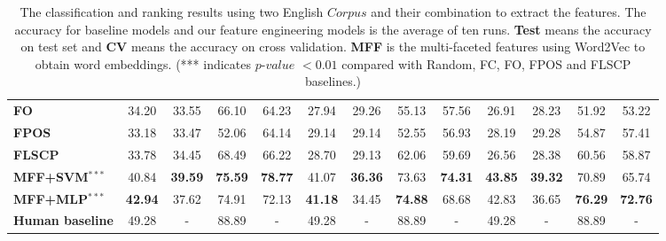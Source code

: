 \begin{table*}[h]
\begin{center}
\begin{tabular}{lcccccccccccc}
			\textbf{FO}&34.20 &33.55 &66.10 &64.23&27.94&29.26&55.13 &57.56 &26.91 &28.23 &51.92 &53.22 \\
			\textbf{FPOS}&33.18&33.47&52.06&64.14&29.14&29.14&52.55&56.93&28.19&29.28&54.87&57.41 \\
			\textbf{FLSCP}&33.78&34.45&68.49&66.22&28.70&29.13&62.06&59.69&26.56&28.38&60.56&58.87\\
			\midrule
			\textbf{MFF+SVM$^{***}$}& 40.84& \textbf{39.59} & \textbf{75.59} & \textbf{78.77}& 41.07& \textbf{36.36} & 73.63 & \textbf{74.31} & \textbf{43.85} & \textbf{39.32}& 70.89& 65.74\\ 
			\textbf{MFF+MLP$^{***}$}&\textbf{42.94}&37.62&74.91&72.13&\textbf{41.18}&34.45&\textbf{74.88}&68.68&42.83&36.65&\textbf{76.29}&\textbf{72.76}\\
			\midrule
			\textbf{Human baseline}&49.28 &-&88.89 &-&49.28 &-&88.89 &-&49.28 &-&88.89 &-\\
			\bottomrule[1pt]
		\end{tabular}
	\end{center}
	\caption{\label{tab:resultsEnglish} 
		The classification and ranking results 
		using two English $Corpus$ and their combination to extract the features.
		The accuracy for baseline models and our feature engineering models is the average of ten runs.
		\textbf{Test} means the accuracy on test set and \textbf{CV} means the accuracy on cross validation.
		\textbf{MFF} is the multi-faceted features using Word2Vec to obtain word embeddings.
		(*** indicates $p$-$value$ $<0.01$ compared with Random, FC, FO, FPOS and FLSCP baselines.)}
\end{table*}

